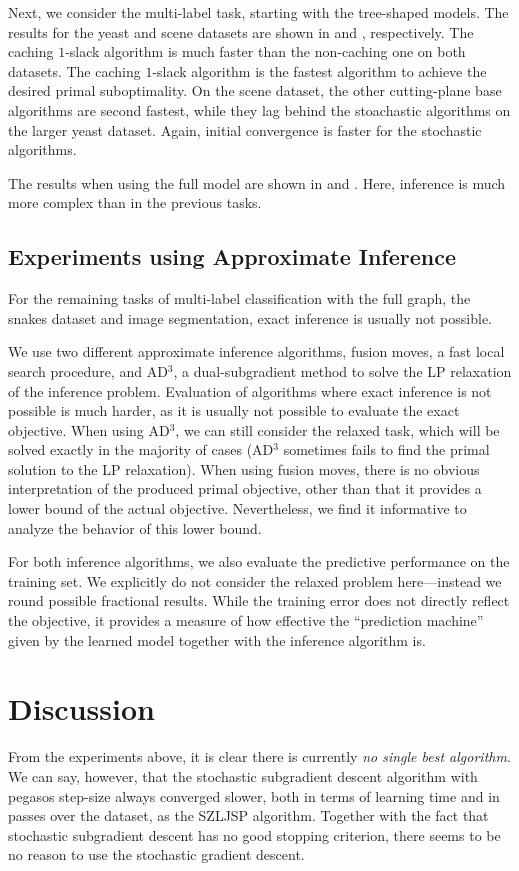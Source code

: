 Next, we consider the multi-label task, starting with the tree-shaped models.
The results for the yeast and scene datasets are shown in  and ,
respectively. The caching $1$-slack algorithm is much faster than the non-caching one on both datasets.
The caching $1$-slack algorithm is the fastest algorithm to achieve the desired primal suboptimality.
On the scene dataset, the other cutting-plane base algorithms are second fastest, while they
lag behind the stoachastic algorithms on the larger yeast dataset. Again, initial convergence is
faster for the stochastic algorithms.

The results when using the full model are shown in  and .
Here, inference is much more complex than in the previous tasks.

\subsection{Experiments using Approximate Inference}
For the remaining tasks of multi-label classification with the full graph, the
snakes dataset and image segmentation, exact inference is usually not possible.

We use two different approximate inference algorithms, fusion moves, a fast
local search procedure, and AD$^3$, a dual-subgradient method to solve the LP
relaxation of the inference problem.
Evaluation of algorithms where exact inference is not possible is much harder,
as it is usually not possible to evaluate the exact objective. When using AD$^3$,
we can still consider the relaxed task, which will be solved exactly in the
majority of cases (AD$^3$ sometimes fails to find the primal solution to the LP
relaxation). %
When using fusion moves, there is no obvious interpretation of the produced
primal objective, other than that it provides a lower bound of the actual
objective. Nevertheless, we find it informative to analyze the behavior of this lower bound.

For both inference algorithms, we also evaluate the predictive performance on
the training set.  We explicitly do not consider the relaxed problem
here---instead we round possible fractional results.
While the training error does not directly reflect the objective, it provides
a measure of how effective the ``prediction machine'' given by the learned model
together with the inference algorithm is.

\section{Discussion}
From the experiments above, it is clear there is currently \emph{no single best algorithm}.
We can say, however, that the stochastic subgradient descent algorithm with
pegasos step-size always converged slower, both in terms of learning time and
in passes over the dataset, as the SZLJSP algorithm.
Together with the fact that stochastic subgradient descent has no good stopping
criterion, there seems to be no reason to use the stochastic gradient descent.
